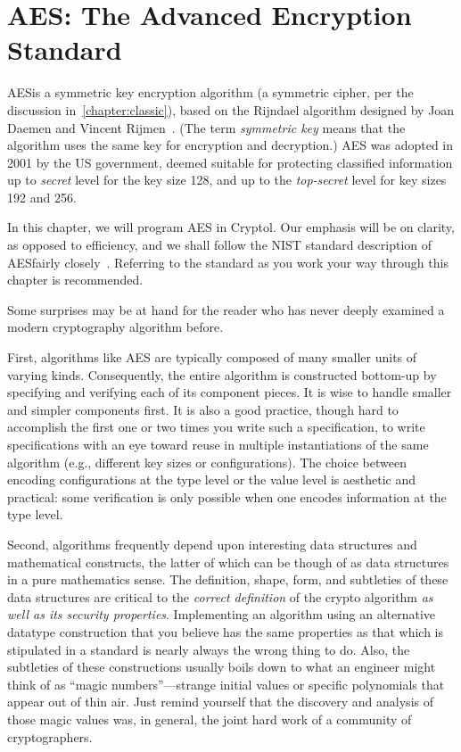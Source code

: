
\chapter{AES: The Advanced Encryption Standard}
\label{chapter:aes}

AES\indAES is a symmetric key encryption algorithm (a symmetric
cipher, per the discussion in~\autoref{chapter:classic}), based on the
Rijndael algorithm designed by Joan Daemen and Vincent
Rijmen~\cite{DaemenR02}\glosAES. (The term {\em symmetric key} means
that the algorithm uses the same key for encryption and
decryption.\indSymKey) AES was adopted in 2001 by the US government,
deemed suitable for protecting classified information up to {\em
  secret} level for the key size 128, and up to the {\em top-secret}
level for key sizes 192 and 256.

In this chapter, we will program AES in Cryptol. Our emphasis will be
on clarity, as opposed to efficiency, and we shall follow the NIST
standard description of AES\indAES fairly closely~\cite{aes}\glosNIST.
Referring to the standard as you work your way through this chapter is
recommended.

Some surprises may be at hand for the reader who has never deeply
examined a modern cryptography algorithm before.  

First, algorithms like AES are typically composed of many smaller
units of varying kinds.  Consequently, the entire algorithm is
constructed bottom-up by specifying and verifying each of its
component pieces.  It is wise to handle smaller and simpler components
first.  It is also a good practice, though hard to accomplish the
first one or two times you write such a specification, to write
specifications with an eye toward reuse in multiple instantiations of
the same algorithm (e.g., different key sizes or configurations).  The
choice between encoding configurations at the type level or the value
level is aesthetic and practical: some verification is only possible
when one encodes information at the type level.

Second, algorithms frequently depend upon interesting data structures
and mathematical constructs, the latter of which can be though of as
data structures in a pure mathematics sense.  The definition, shape,
form, and subtleties of these data structures are critical to the
\emph{correct definition} of the crypto algorithm \emph{as well as its
  security properties}.  Implementing an algorithm using an
alternative datatype construction that you believe has the same
properties as that which is stipulated in a standard is nearly always
the wrong thing to do.  Also, the subtleties of these constructions
usually boils down to what an engineer might think of as ``magic
numbers''---strange initial values or specific polynomials that appear
out of thin air.  Just remind yourself that the discovery and analysis
of those magic values was, in general, the joint hard work of a
community of cryptographers.

